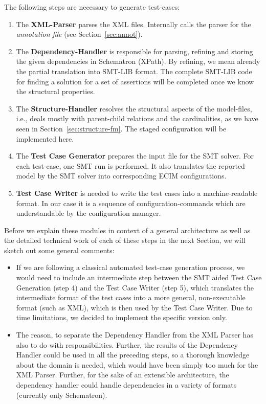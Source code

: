 The following steps are necessary to generate test-cases:

\begin{enumerate}
 \item The \textbf{XML-Parser} parses the XML files. Internally calls the parser for the \emph{annotation file} (see Section~\ref{sec:annot}).
 
 \item The \textbf{Dependency-Handler} is responsible for parsing, refining and storing the given dependencies in Schematron (XPath). By refining, we mean already the partial translation into SMT-LIB format. The complete SMT-LIB code for finding a solution for a set of assertions will be completed once we know the structural properties.
 
 \item The \textbf{Structure-Handler} resolves the structural aspects of the model-files, i.e., deals mostly with parent-child relations and the cardinalities, as we have seen in Section~\ref{sec:structure-fm}. The staged configuration will be implemented here.
 
 \item The \textbf{Test Case Generator} prepares 
 the input file for the SMT solver. For each test-case, one SMT run is performed. It also translates the reported model by the SMT solver into corresponding ECIM configurations.
 
 \item \textbf{Test Case Writer} is needed to write the test cases into a machine-readable format. In our case it is a sequence of configuration-commands which are understandable by the configuration manager.
\end{enumerate}

Before we explain these modules in context of a general architecture as well as the detailed technical work of each of these steps in the next Section, we will sketch out some general comments:
\begin{itemize}
 \item If we are following a classical automated test-case generation process, we would need to include an intermediate step between the SMT aided Test Case Generation (step 4) and the Test Case Writer (step 5), which translates the intermediate format of the test cases into a more general, non-executable format (such as XML), which is then used by the Test Case Writer. Due to time limitations, we decided to implement the specific version only.
 
 \item The reason, to separate the Dependency Handler from the XML Parser has also to do with responsibilities. Further, the results of the Dependency Handler could be used in all the preceding steps, so a thorough knowledge about the domain is needed, which would have been simply too much for the XML Parser. Further, for the sake of an extensible architecture, the dependency handler could handle dependencies in a variety of formats (currently only Schematron).
\end{itemize}

